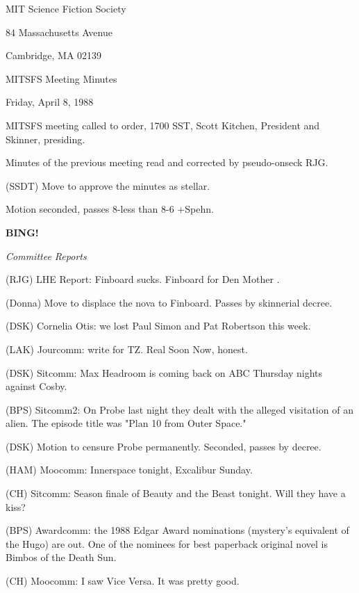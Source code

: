 \documentclass[12pt]{article}
\newcommand{\bing}{{\bf BING!} }
\newcommand{\goto}[1]{\bing \vskip 12pt \centerline{{\em{#1}}}}
\begin{document}
\begin{center}

MIT Science Fiction Society 

84 Massachusetts Avenue

Cambridge, MA 02139

\vspace{12pt}

MITSFS Meeting Minutes 

Friday, April 8, 1988

\end{center}
 
\vspace{18pt}

\setlength{\parskip}{6pt}

\noindent
MITSFS meeting called to order, 1700 SST,
Scott Kitchen, President and Skinner, presiding.

Minutes of the previous meeting read and corrected by pseudo-onseck RJG.

(SSDT) Move to approve the minutes as stellar.

Motion seconded, passes 8-less than 8-6 +Spehn.

\goto{Committee Reports}

(RJG) LHE Report: Finboard sucks. Finboard for Den Mother     .

(Donna) Move to displace the nova to Finboard. Passes by skinnerial decree.

(DSK) Cornelia Otis: we lost Paul Simon and Pat Robertson this week.

(LAK) Jourcomm: write for TZ. Real Soon Now, honest.

(DSK) Sitcomm: Max Headroom is coming back on ABC Thursday nights against Cosby.

(BPS) Sitcomm2: On Probe last night they dealt with the alleged visitation of an alien. The episode title was "Plan 10 from Outer Space."

(DSK) Motion to censure Probe permanently. Seconded, passes by decree.

(HAM) Moocomm: Innerspace tonight, Excalibur Sunday.

(CH) Sitcomm: Season finale of Beauty and the Beast tonight. Will they have a kiss?

(BPS) Awardcomm: the 1988 Edgar Award nominations (mystery's equivalent of the Hugo) are out. One of the nominees for best paperback original novel is Bimbos of the Death Sun.

(CH) Moocomm: I saw Vice Versa. It was pretty good.
\end{document}

